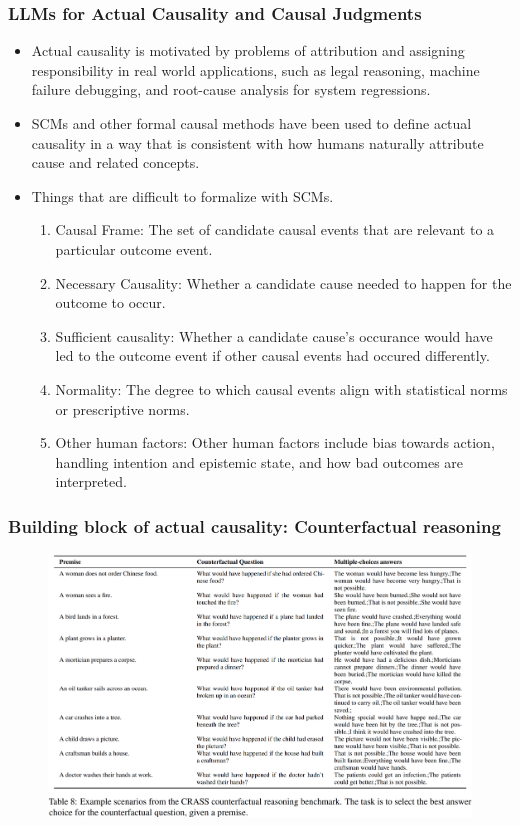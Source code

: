 \documentclass{beamer}
\begin{document}
\begin{frame}
	\frametitle{LLMs for Actual Causality and Causal Judgments}
	\begin{itemize}
		\item Actual causality is motivated by problems of attribution and assigning responsibility in real world applications, such as legal reasoning,
			machine failure debugging, and root-cause analysis for system regressions.
		\item SCMs and other formal causal methods have been used to define actual causality in a way that is consistent with how humans 
			naturally attribute cause and related concepts.
		\item Things that are difficult to formalize with SCMs.
		\begin{enumerate}
			\item Causal Frame: The set of candidate causal events that are relevant to a particular outcome event.
			\item Necessary Causality: Whether a candidate cause needed to happen for the outcome to occur.
			\item Sufficient causality: Whether a candidate cause's occurance would have led to the outcome event if other causal events had 
				occured differently.
			\item Normality: The degree to which causal events align with statistical norms or prescriptive norms.
			\item Other human factors: Other human factors include bias towards action, handling intention and epistemic state, and how
				bad outcomes are interpreted.
		\end{enumerate}
	\end{itemize}
\end{frame}

\begin{frame}
	\frametitle{Building block of actual causality: Counterfactual reasoning}
	\begin{figure}
		\centering
		\includegraphics[scale=0.2]{imgs/table8.png}
	\end{figure}
\end{frame}
\end{document}
